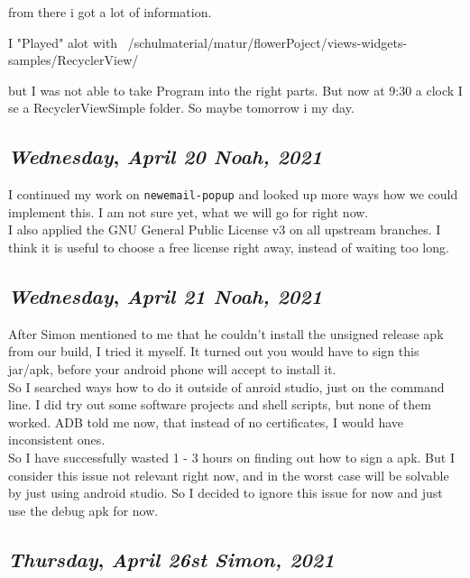 from there i got a lot of information. 

I "Played" alot with ~/schulmaterial/matur/flowerPoject/views-widgets-samples/RecyclerView/

but I was not able to take Program into the right parts. But now at 9:30 a clock I se a RecyclerViewSimple folder. So maybe tomorrow i my day. 



\def\day{\textit{April 20 Noah, 2021}}
\def\weekday{\textit{Wednesday}}
\subsection*{\weekday, \day}

I continued my work on \texttt{newemail-popup} and looked up more ways how we  could implement this. I am not sure yet, what we will go for right now.\\

I also applied the GNU General Public License v3 on all upstream branches. I think it is useful to choose a free license right away, instead of waiting too long.

\def\day{\textit{April 21 Noah, 2021}}
\def\weekday{\textit{Wednesday}}
\subsection*{\weekday, \day}

After Simon mentioned to me that he couldn't install the unsigned release apk from our build, I tried it myself. It turned out you would have to sign this jar/apk, before your android phone will accept to install it.\\

So I searched ways how to do it outside of anroid studio, just on the command line. I did try out some software projects and shell scripts, but none of them worked. ADB told me now, that instead of no certificates, I would have inconsistent ones.\\

So I have successfully wasted 1 - 3 hours on finding out how to sign a apk. But I consider this issue not relevant right now, and in the worst case will be solvable by just using android studio. So I decided to ignore this issue for now and just use the debug apk for now.



\def\day{\textit{April 26st Simon, 2021}}
\def\weekday{\textit{Thursday}}
\subsection*{\weekday, \day}

